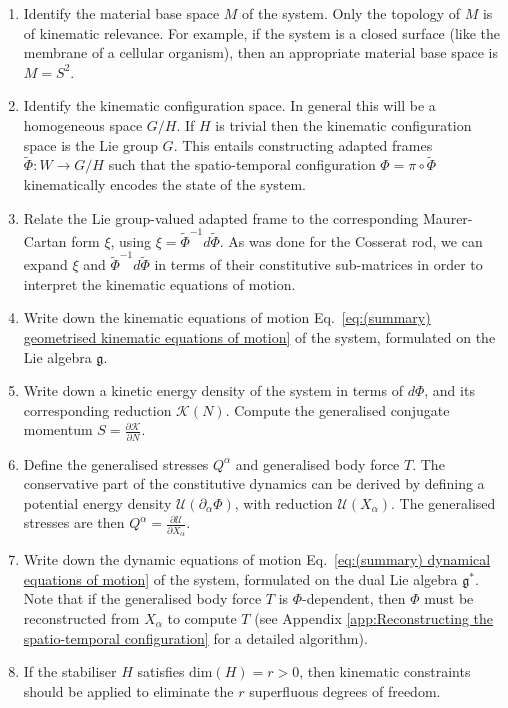 \begin{enumerate}

\item Identify the material base space $M$ of the system. Only the topology of $M$ is of kinematic relevance. For example, if the system is a closed surface (like the membrane of a cellular organism), then an appropriate material base space is $M = S^2$.

\item Identify the kinematic configuration space. In general this will be a homogeneous space $G/H$. If $H$ is trivial then the kinematic configuration space is the Lie group $G$. This entails constructing adapted frames $\tilde{\Phi} : W \to G/H$ such that the spatio-temporal configuration $\Phi = \pi \circ \tilde{\Phi}$ kinematically encodes the state of the system. 

\item Relate the Lie group-valued adapted frame to the corresponding Maurer-Cartan form $\xi$, using $\xi = \tilde{\Phi}^{-1} d \tilde{\Phi}$. As was done for the Cosserat rod, we can expand $\xi$  and $\tilde{\Phi}^{-1} d \tilde{\Phi}$ in terms of their constitutive sub-matrices in order to interpret the kinematic equations of motion.

\item Write down the kinematic equations of motion Eq.~\ref{eq:(summary) geometrised kinematic equations of motion} of the system, formulated on the Lie algebra $\mathfrak{g}$.

\item Write down a kinetic energy density of the system in terms of $d \Phi$, and its corresponding reduction $\mathcal{K}(N)$. Compute the generalised conjugate momentum $S = \frac{\partial \mathcal{K}}{\partial N}$.

\item Define the generalised stresses $Q^\alpha$ and generalised body force $T$. The conservative  part of the constitutive dynamics can be derived by defining a potential energy density $\mathcal{U}(\partial_\alpha \Phi)$, with reduction $\mathcal{U}(X_\alpha)$. The generalised stresses are then $Q^\alpha = \frac{\partial \mathcal{U}}{\partial X_\alpha}$.

\item Write down the dynamic equations of motion Eq.~\ref{eq:(summary) dynamical equations of motion} of the system, formulated on the dual Lie algebra $\mathfrak{g}^*$. Note that if the generalised body force $T$ is $\Phi$-dependent, then $\Phi$ must be reconstructed from $X_\alpha$ to compute $T$ (see Appendix \ref{app:Reconstructing the spatio-temporal configuration} for a detailed algorithm).

\item If the stabiliser $H$ satisfies $\text{dim}(H) = r > 0$, then kinematic constraints should be applied to eliminate the $r$ superfluous degrees of freedom.

\end{enumerate}

